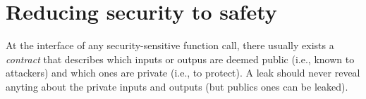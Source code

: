\section{Reducing security to safety}





At the interface of any security-sensitive function call, there usually exists a
\emph{contract} that describes which inputs or outpus are deemed public (i.e.,
known to attackers) and which ones are private (i.e., to protect). A leak should
never reveal anyting about the private inputs and outputs (but publics ones 
can be leaked).


